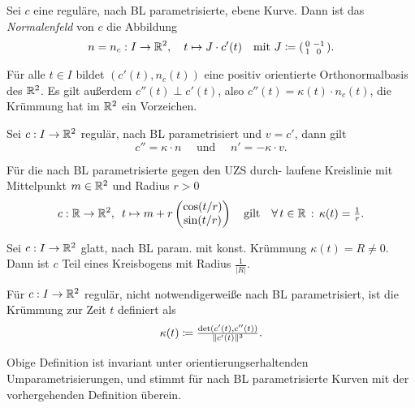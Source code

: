 \documentclass{cheat-sheet}
\begin{document}
\begin{defn}
  Sei $c$ eine reguläre, nach BL parametrisierte, ebene Kurve. Dann ist das \emph{Normalenfeld} von $c$ die Abbildung
  \[ n = n_c : I \to \mathbb{R}^2, \quad t \mapsto J \cdot c'(t) \quad \text{mit } J \coloneqq (\begin{smallmatrix} 0 & -1 \\ 1 & 0 \end{smallmatrix}).  \]
  
\end{defn}

\begin{bem}
  Für alle $t \in I$ bildet $(c'(t), n_c(t))$ eine positiv orientierte Orthonormalbasis des $\mathbb{R}^2$.
  Es gilt außerdem $c''(t) \perp c'(t)$, also $c''(t) = \kappa(t) \cdot n_c(t)$, \dh{} die Krümmung hat im $\mathbb{R}^2$ ein Vorzeichen.
\end{bem}

\begin{satz}
  Sei $c : I \to \mathbb{R}^2$ regulär, nach BL parametrisiert und $v = c'$, dann gilt
  \[ c'' = \kappa \cdot n \quad \text{ und } \quad n' = -\kappa \cdot v. \]
\end{satz}


\begin{bsp}
  Für die nach BL parametrisierte gegen den UZS durch- laufene Kreislinie mit Mittelpunkt $m \in \mathbb{R}^2$ und Radius $r > 0$
  \[
    c : \mathbb{R} \to \mathbb{R}^2, \enspace t \mapsto m + r \begin{pmatrix} \cos(t/r) \\ \sin(t/r) \end{pmatrix}
    \quad \text{gilt} \quad
    \forall \, {t \in \mathbb{R}} \,:\, \kappa(t) = \tfrac{1}{r}.
  \]
\end{bsp}

\begin{satz}
  Sei $c : I \to \mathbb{R}^2$ glatt, nach BL param. mit konst. Krümmung $\kappa(t) = R \not= 0$. Dann ist $c$ Teil eines Kreisbogens mit Radius $\tfrac{1}{|R|}$.
\end{satz}

\begin{defn}
  Für $c : I \to \mathbb{R}^2$ regulär, nicht notwendigerweiße nach BL parametrisiert, ist die Krümmung zur Zeit $t$ definiert als
  \[ \kappa(t) \coloneqq \tfrac{\det(c'(t), c''(t))}{\lVert c'(t)\rVert^3}. \]
\end{defn}

\begin{bem}
  Obige Definition ist invariant unter orientierungserhaltenden Umparametrisierungen, und stimmt für nach BL parametrisierte Kurven mit der vorhergehenden Definition überein.
\end{bem}
\end{document}
